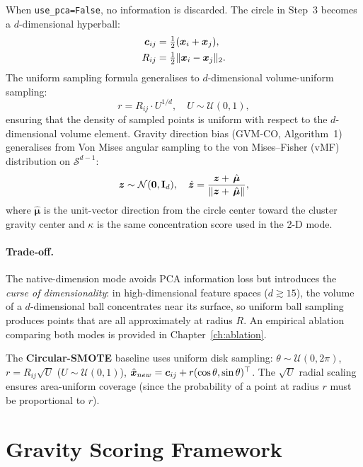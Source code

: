 When \texttt{use\_pca=False}, no information is discarded.
The circle in Step~3 becomes a $d$-dimensional hyperball:
\begin{align}
    \bm{c}_{ij} &= \tfrac{1}{2}(\bm{x}_i + \bm{x}_j), \\
    R_{ij}   &= \tfrac{1}{2}\|\bm{x}_i - \bm{x}_j\|_2.
\end{align}
The uniform sampling formula generalises to $d$-dimensional volume-uniform sampling:
\begin{equation}
    r = R_{ij} \cdot U^{1/d}, \quad U \sim \mathcal{U}(0, 1),
    \label{eq:nd_radius_sample}
\end{equation}
ensuring that the density of sampled points is uniform with respect to the $d$-dimensional volume element.
Gravity direction bias (GVM-CO, Algorithm~1) generalises from Von Mises angular sampling to the von Mises--Fisher (vMF) distribution on $\mathcal{S}^{d-1}$:
\begin{equation}
    \bm{z} \sim \mathcal{N}(\bm{0}, \mathbf{I}_d), \quad \hat{\bm{z}} = \frac{\bm{z} + \,\hat{\bm{\mu}}}{\|\bm{z} + \,\hat{\bm{\mu}}\|},
    \label{eq:vmf_approx}
\end{equation}
where $\hat{\bm{\mu}}$ is the unit-vector direction from the circle center toward the cluster gravity center and $\kappa$ is the same concentration score used in the 2-D mode.

\paragraph{Trade-off.}
The native-dimension mode avoids PCA information loss but introduces the \emph{curse of dimensionality}: in high-dimensional feature spaces ($d \gtrsim 15$), the volume of a $d$-dimensional ball concentrates near its surface, so uniform ball sampling produces points that are all approximately at radius $R$.
An empirical ablation comparing both modes is provided in Chapter~\ref{ch:ablation}.

The \textbf{Circular-SMOTE} baseline uses uniform disk sampling: $\theta \sim \mathcal{U}(0,2\pi)$, $r = R_{ij}\sqrt{U}$ ($U \sim \mathcal{U}(0,1)$), $\hat{\bm{x}}_{new} = \bm{c}_{ij} + r(\cos\theta,\sin\theta)^\top$.
The $\sqrt{U}$ radial scaling ensures area-uniform coverage (since the probability of a point at radius $r$ must be proportional to $r$).


\section{Gravity Scoring Framework}
\label{sec:methods:gravity}

